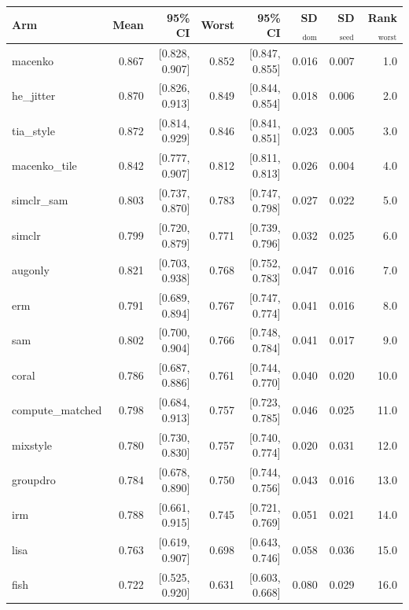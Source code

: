 \begin{tabular}{lrrrrrrr}
\toprule
Arm & Mean & 95\% CI & Worst & 95\% CI & SD$_\text{dom}$ & SD$_\text{seed}$ & Rank$_\text{worst}$ \\
\midrule
macenko & 0.867 & [0.828, 0.907] & 0.852 & [0.847, 0.855] & 0.016 & 0.007 & 1.0 \\
he\_jitter & 0.870 & [0.826, 0.913] & 0.849 & [0.844, 0.854] & 0.018 & 0.006 & 2.0 \\
tia\_style & 0.872 & [0.814, 0.929] & 0.846 & [0.841, 0.851] & 0.023 & 0.005 & 3.0 \\
macenko\_tile & 0.842 & [0.777, 0.907] & 0.812 & [0.811, 0.813] & 0.026 & 0.004 & 4.0 \\
simclr\_sam & 0.803 & [0.737, 0.870] & 0.783 & [0.747, 0.798] & 0.027 & 0.022 & 5.0 \\
simclr & 0.799 & [0.720, 0.879] & 0.771 & [0.739, 0.796] & 0.032 & 0.025 & 6.0 \\
augonly & 0.821 & [0.703, 0.938] & 0.768 & [0.752, 0.783] & 0.047 & 0.016 & 7.0 \\
erm & 0.791 & [0.689, 0.894] & 0.767 & [0.747, 0.774] & 0.041 & 0.016 & 8.0 \\
sam & 0.802 & [0.700, 0.904] & 0.766 & [0.748, 0.784] & 0.041 & 0.017 & 9.0 \\
coral & 0.786 & [0.687, 0.886] & 0.761 & [0.744, 0.770] & 0.040 & 0.020 & 10.0 \\
compute\_matched & 0.798 & [0.684, 0.913] & 0.757 & [0.723, 0.785] & 0.046 & 0.025 & 11.0 \\
mixstyle & 0.780 & [0.730, 0.830] & 0.757 & [0.740, 0.774] & 0.020 & 0.031 & 12.0 \\
groupdro & 0.784 & [0.678, 0.890] & 0.750 & [0.744, 0.756] & 0.043 & 0.016 & 13.0 \\
irm & 0.788 & [0.661, 0.915] & 0.745 & [0.721, 0.769] & 0.051 & 0.021 & 14.0 \\
lisa & 0.763 & [0.619, 0.907] & 0.698 & [0.643, 0.746] & 0.058 & 0.036 & 15.0 \\
fish & 0.722 & [0.525, 0.920] & 0.631 & [0.603, 0.668] & 0.080 & 0.029 & 16.0 \\
\bottomrule
\end{tabular}
